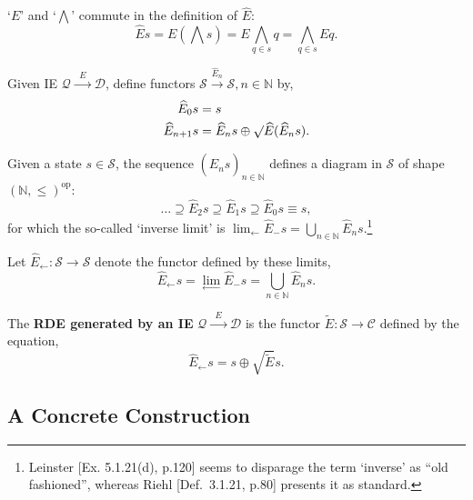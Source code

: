 \documentclass{article}
\newcommand{\N}{\mathbb{N}}
\renewcommand{\S}{\ensuremath{\mathcal{S}}} %
\newcommand{\A}{\ensuremath{\mathcal{A}}}
\newcommand{\C}{\ensuremath{\mathcal{C}}}
\newcommand{\D}{\ensuremath{\mathcal{D}}}
\newcommand{\Q}{\ensuremath{\mathcal{Q}}}
\newcommand{\IE}{\ensuremath{\Q \xrightarrow{\;\;E\;\;} \D}}
\newcommand{\E}{\ensuremath{\widehat{E}}}
\DeclareMathOperator{\dual}{op}
\begin{document}
\begin{fact}
  `$E$' and `$\bigwedge$\!' commute in the definition of $\E$:
  $$
  \E s = E \left(\bigwedge s\right) = E \bigwedge_{q \in s} q = \bigwedge_{q \in s} E q.
  $$
\end{fact}

\begin{nota}\label{altmutrec}
  Given IE $\Q \xrightarrow{\;\;E\;\;} \D$, define functors $\S \xrightarrow{\E_n} \S, n \in \N$ by,
  $$
  \begin{aligned}
    \E_0 s &= s \\
    \E_{n+1} s &= \E_n s \oplus \surd\E(\E_n s).
  \end{aligned}
  $$
\end{nota}

\begin{fact}
  Given a state $s \in \S$, the sequence $(\E_n s)_{n\in\N}$ defines a diagram in $\S$ of shape $(\N,\le)^{\dual}$:
  $$
  \dots \supseteq \E_2s \supseteq \E_1s \supseteq \E_0s\equiv s,
  $$
for which the so-called `inverse limit' is $\displaystyle{\lim_{\longleftarrow} \E_{-} s} = \bigcup_{n\in\N} \E_n s$.\footnote{Leinster [Ex. 5.1.21(d), p.120] seems to disparage the term `inverse' as ``old fashioned'', whereas Riehl [Def.~3.1.21, p.80] presents it as standard.}
\end{fact}

\begin{nota}
  Let $\E_\leftarrow : \S \rightarrow \S$ denote the functor defined by these limits,
  $$
  \E_\leftarrow s = \displaystyle{\lim_{\longleftarrow} \E_{-} s} = \bigcup_{n\in\N} \E_n s.
  $$
\end{nota}

\begin{defn}\label{rdegenbyie}
  The \textbf{RDE generated by an IE} $\IE$ is the functor $\widetilde{E} : \S \rightarrow \C$ defined by the equation,
  $$
  \E_\leftarrow s = s \oplus \surd\widetilde{E} s.
  $$
  \begin{center}
  \end{center}
\end{defn}

\subsection{A Concrete Construction}
\end{document}
